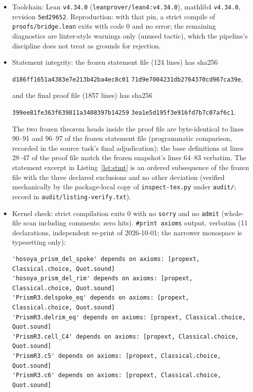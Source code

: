 \documentclass[11pt]{article}
\begin{document}
\begin{itemize}
\item Toolchain: Lean \texttt{v4.34.0} (\texttt{leanprover/lean4:v4.34.0}),
mathlib4 \texttt{v4.34.0}, revision \texttt{5ed29652}. Reproduction: with that
pin, a strict compile of \texttt{proofs/bridge.lean} exits with code $0$ and
no error; the remaining diagnostics are linter-style warnings only (unused
tactic), which the pipeline's discipline does not treat as grounds for
rejection.
\item Statement integrity: the frozen statement file (124 lines) has sha256
\begin{center}
\texttt{d186ff1651a4383e7e213b42ba4ec8c01}\allowbreak
\texttt{71d9e7004231db2764370cd967ca39e},
\end{center}
and the final proof file (1857 lines) has sha256
\begin{center}
\texttt{399ee81fe363f639811a3408397b14259}\allowbreak
\texttt{3ea1e5d195f3e916fd7b7c07af6c1}.
\end{center}
The two frozen theorem heads inside the proof file are byte-identical to
lines 90--91 and 96--97 of the frozen statement file (programmatic
comparison, recorded in the source task's final adjudication); the base
definitions at lines 28--47 of the proof file match the frozen snapshot's
lines 64--83 verbatim. The statement excerpt in Listing~\ref{lst:stmt} is an
ordered subsequence of the frozen file with the three declared exclusions and
no other deviation (verified mechanically by the package-local copy of
\texttt{inspect-tex.py} under \texttt{audit/}; record in
\texttt{audit/listing-verify.txt}).
\item Kernel check: strict compilation exits 0 with no \texttt{sorry} and no
\texttt{admit} (whole-file scan including comments: zero hits).
\texttt{\#print axioms} output, verbatim (11 declarations, independent
re-print of 2026-10-01; the narrower monospace is typesetting only):
\begin{lstlisting}[basicstyle=\ttfamily\footnotesize,frame=none]
'hosoya_prism_del_spoke' depends on axioms: [propext, Classical.choice, Quot.sound]
'hosoya_prism_del_rim' depends on axioms: [propext, Classical.choice, Quot.sound]
'PrismR3.delspoke_eq' depends on axioms: [propext, Classical.choice, Quot.sound]
'PrismR3.delrim_eq' depends on axioms: [propext, Classical.choice, Quot.sound]
'PrismR3.cell_C4' depends on axioms: [propext, Classical.choice, Quot.sound]
'PrismR3.c5' depends on axioms: [propext, Classical.choice, Quot.sound]
'PrismR3.c6' depends on axioms: [propext, Classical.choice, Quot.sound]

\end{lstlisting}
\end{itemize}
\end{document}
